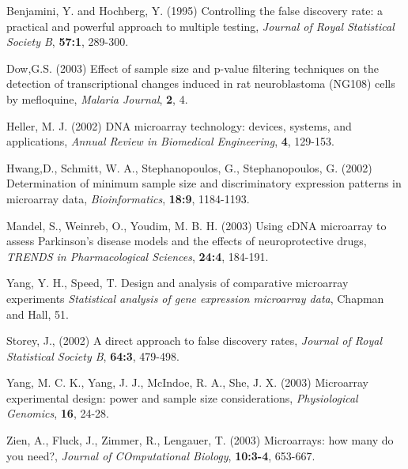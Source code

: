 \documentclass{bioinfo}
\begin{document}
\begin{thebibliography}{}

 Benjamini, Y. and Hochberg, Y. (1995)
  Controlling the false discovery rate: a practical and powerful
  approach to multiple testing, {\it Journal of Royal Statistical
    Society B}, {\bf 57:1}, 289-300.

 Dow,G.S. (2003) Effect of sample size and p-value filtering techniques on the detection of transcriptional changes induced in
  rat neuroblastoma (NG108) cells by mefloquine, {\it Malaria Journal}, {\bf 2}, 4.

 Heller, M. J. (2002) {DNA microarray technology: devices, systems, and applications},
  {\it Annual Review in Biomedical Engineering}, {\bf 4}, 129-153.

 Hwang,D., Schmitt, W. A., Stephanopoulos, G., Stephanopoulos, G. (2002)
  Determination of minimum sample size and discriminatory expression patterns in microarray data,
  {\it Bioinformatics}, {\bf 18:9}, 1184-1193.

 Mandel, S.,  Weinreb, O., Youdim, M. B. H. (2003)
  Using cDNA microarray to assess Parkinson's disease models and
  the effects of neuroprotective drugs, {\it TRENDS in Pharmacological Sciences}, {\bf 24:4}, 184-191.

 Yang, Y. H., Speed, T. {Design and analysis of comparative microarray experiments
  \it Statistical analysis of gene expression microarray data},  {Chapman and Hall}, 51.

 Storey, J., (2002)
  A direct approach to false discovery rates, {\it Journal of Royal Statistical Society B}, {\bf 64:3}, 479-498.

 Yang, M. C. K., Yang, J. J., McIndoe, R. A., She, J. X. (2003)
  Microarray experimental design: power and sample size considerations, {\it Physiological Genomics}, {\bf 16}, 24-28.

 Zien, A., Fluck, J., Zimmer, R., Lengauer, T. (2003)
  Microarrays: how many do you need?, {\it Journal of COmputational Biology}, {\bf 10:3-4}, 653-667.
\end{thebibliography}
\end{document}
